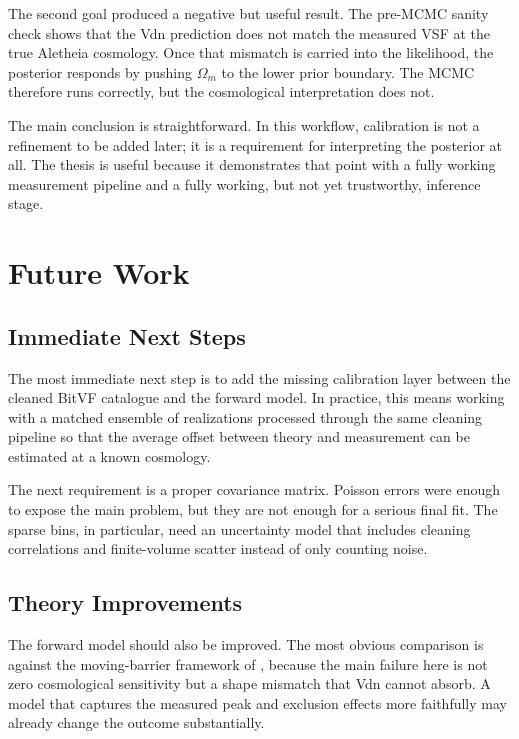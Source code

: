 \documentclass[12pt]{report}
\begin{document}
The second goal produced a negative but useful result. The pre-MCMC sanity check shows that the Vdn prediction does not match the measured VSF at the true Aletheia cosmology. Once that mismatch is carried into the likelihood, the posterior responds by pushing $\Omega_m$ to the lower prior boundary. The MCMC therefore runs correctly, but the cosmological interpretation does not.

The main conclusion is straightforward. In this workflow, calibration is not a refinement to be added later; it is a requirement for interpreting the posterior at all. The thesis is useful because it demonstrates that point with a fully working measurement pipeline and a fully working, but not yet trustworthy, inference stage.

\chapter{Future Work}
\label{chap:future_work}

\section{Immediate Next Steps}

The most immediate next step is to add the missing calibration layer between the cleaned BitVF catalogue and the forward model. In practice, this means working with a matched ensemble of realizations processed through the same cleaning pipeline so that the average offset between theory and measurement can be estimated at a known cosmology.

The next requirement is a proper covariance matrix. Poisson errors were enough to expose the main problem, but they are not enough for a serious final fit. The sparse bins, in particular, need an uncertainty model that includes cleaning correlations and finite-volume scatter instead of only counting noise.

\section{Theory Improvements}

The forward model should also be improved. The most obvious comparison is against the moving-barrier framework of \citet{Verza2024}, because the main failure here is not zero cosmological sensitivity but a shape mismatch that Vdn cannot absorb. A model that captures the measured peak and exclusion effects more faithfully may already change the outcome substantially.
\end{document}
